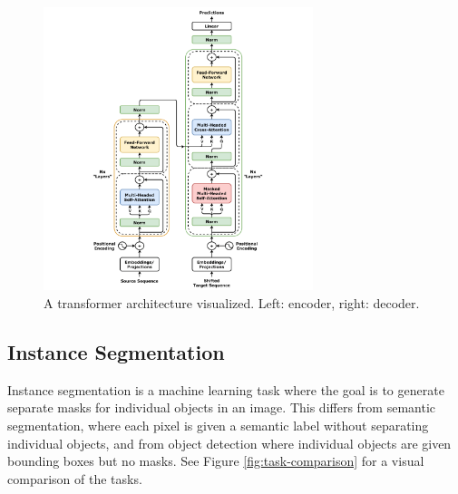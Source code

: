 \documentclass[english, 12pt, a4paper, sci, utf8, a-2b, online]{aaltothesis}
\begin{document}
\begin{figure}[h]
    \centering
    \includegraphics[width=0.7\textwidth]{figures/transformer.png}
    \caption{A transformer architecture visualized. Left: encoder, right: decoder. \cite{transformer}}
    \label{fig:transformer}
\end{figure}

\subsection{Instance Segmentation}

Instance segmentation is a machine learning task where the goal is to generate separate masks for individual objects in an image. This differs from semantic segmentation, where each pixel is given a semantic label without separating individual objects, and from object detection where individual objects are given bounding boxes but no masks. See Figure \ref{fig:task-comparison} for a visual comparison of the tasks.
\end{document}
